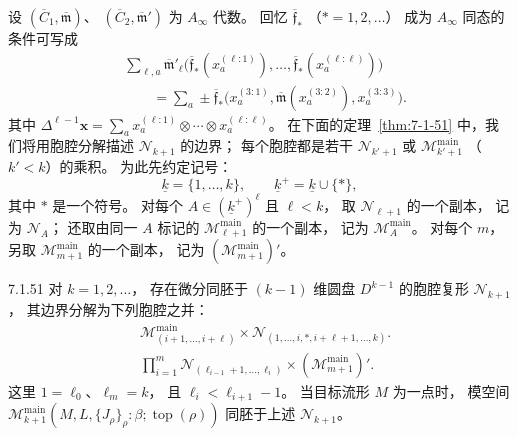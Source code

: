 设
$(\overline C_1,\overline{\mathfrak m})$、
$(\overline C_2,\overline{\mathfrak m}')$
为 $A_\infty$ 代数。
回忆
$\overline{\mathfrak f}_*$
（$*=1,2,\ldots$）
成为 $A_\infty$ 同态的条件可写成
\begin{equation}
\begin{aligned}
&\sum_{\ell,a}
\overline{\mathfrak m}'_\ell
\bigl(
\overline{\mathfrak f}_*
(x_a^{(\ell:1)}),\ldots,
\overline{\mathfrak f}_*
(x_a^{(\ell:\ell)})
\bigr)\\
&\qquad=
\sum_a\pm\overline{\mathfrak f}_*
\bigl(
x_a^{(3:1)},
\overline{\mathfrak m}(x_a^{(3:2)}),
x_a^{(3:3)}
\bigr).
\end{aligned}
\tag{7.1.50}\label{eq:7-1-50}
\end{equation}
其中
$\Delta^{\ell-1}\mathbf x
=\sum_a
x_a^{(\ell:1)}\otimes\cdots\otimes
x_a^{(\ell:\ell)}$。
在下面的定理~\ref{thm:7-1-51}
中，我们将用胞腔分解描述
$\mathcal N_{k+1}$ 的边界；
每个胞腔都是若干
$\mathcal N_{k'+1}$ 或
$\mathcal M^{\mathrm{main}}_{k'+1}$
（$k'<k$）的乘积。
为此先约定记号：
\[
\underline{k}=\{1,\ldots,k\},
\qquad
\underline{k}^{+}
=\underline{k}\cup\{*\},
\]
其中 $*$ 是一个符号。
对每个
$A\in(\underline{k}^{+})^\ell$
且 $\ell<k$，
取 $\mathcal N_{\ell+1}$ 的一个副本，
记为 $\mathcal N_A$；
还取由同一 $A$ 标记的
$\mathcal M^{\mathrm{main}}_{\ell+1}$
的一个副本，
记为 $\mathcal M_A^{\mathrm{main}}$。
对每个 $m$，
另取
$\mathcal M^{\mathrm{main}}_{m+1}$
的一个副本，
记为
$(\mathcal M^{\mathrm{main}}_{m+1})'$。

\begin{theorem}{7.1.51}\label{thm:7-1-51}
对 $k=1,2,\ldots$，
存在微分同胚于 $(k-1)$ 维圆盘
$D^{k-1}$ 的胞腔复形
$\mathcal N_{k+1}$，
其边界分解为下列胞腔之并：
\begin{align}
&\mathcal M^{\mathrm{main}}_{(i+1,\ldots,i+\ell)}
\times
\mathcal N_{(1,\ldots,i,*,i+\ell+1,\ldots,k)}.
\tag{7.1.52.1}\label{eq:7-1-52-1}\\
&\prod_{i=1}^{m}
\mathcal N_{(\ell_{i-1}+1,\ldots,\ell_i)}
\times
(\mathcal M^{\mathrm{main}}_{m+1})'.
\tag{7.1.52.2}\label{eq:7-1-52-2}
\end{align}
这里
$1=\ell_0$、$\ell_m=k$，
且 $\ell_i<\ell_{i+1}-1$。
当目标流形 $M$ 为一点时，
模空间
$\mathcal M^{\mathrm{main}}_{k+1}
(M,L,\{J_\rho\}_\rho:\beta;\operatorname{top}(\rho))$
同胚于上述 $\mathcal N_{k+1}$。
\end{theorem}


